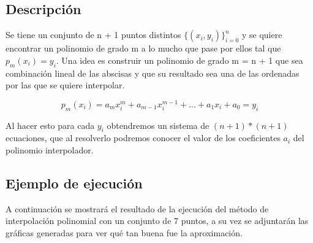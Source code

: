 \documentclass[12pt]{article}
\begin{document}
\subsection{Descripción}
Se tiene un conjunto de n + 1 puntos distintos $\{(x_i, y_i)\}_{i=0}^n$ y se quiere encontrar un polinomio de grado m a lo mucho que pase por ellos tal que $p_m(x_i) = y_i$. Una idea es construir un polinomio de grado m = n + 1 que sea combinación lineal de las abscisas y que su resultado sea una de las ordenadas por las que se quiere interpolar.

$$p_m(x_i) = a_mx_i^m + a_{m-1}x_i^{m-1} + ... + a_1x_i + a_0 = y_i$$

Al hacer esto para cada $y_i$ obtendremos un sistema de $(n + 1) * (n + 1)$ ecuaciones, que al resolverlo podremos conocer el valor de los coeficientes $a_i$ del polinomio interpolador.

\subsection{Ejemplo de ejecución}
A continuación se mostrará el resultado de la ejecución del método de interpolación polinomial con un conjunto de 7 puntos, a su vez se adjuntarán las gráficas generadas para ver qué tan buena fue la aproximación.\\
\end{document}
